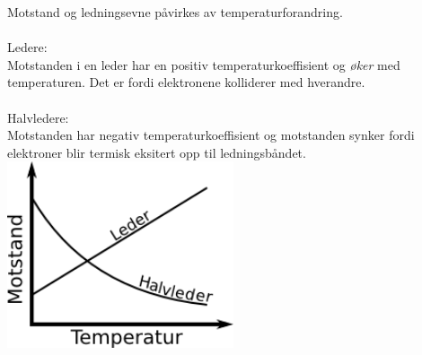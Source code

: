 Motstand og ledningsevne påvirkes av temperaturforandring.
\\\\
Ledere:\\
Motstanden i en leder har en positiv temperaturkoeffisient
og \emph{øker} med temperaturen.
Det er fordi elektronene kolliderer med hverandre.
\\\\
Halvledere:\\
Motstanden har negativ temperaturkoeffisient
og motstanden synker fordi
elektroner blir termisk eksitert opp til ledningsbåndet.
\\
\includegraphics[width=0.5\textwidth]{./img/temperatur}
